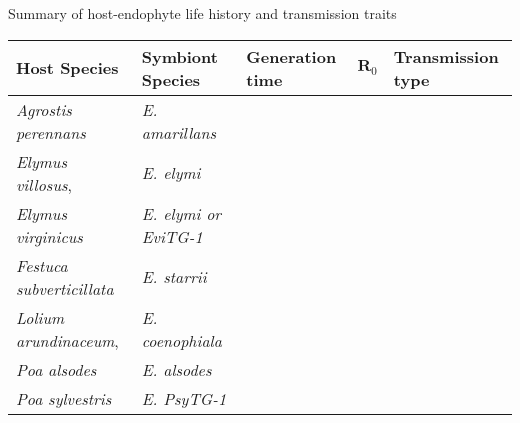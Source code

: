 \documentclass[12pt]{article}
\newcommand{\tom}[2]{{\color{red}{#1}}\footnote{\textit{\color{red}{#2}}}}
\begin{document}

 Summary of host-endophyte life history and transmission traits\\
\begin{table}[ht]
	\begin{adjustbox}{width=1\textwidth}
\begin{tabular}{lllll}
	\bf{Host Species} & \bf{Symbiont Species}& \bf{Generation time} & $\textbf {R}_0$ &\bf{ Transmission type}\\
	\hline
	\emph{Agrostis perennans} &\emph{E. amarillans}&&&\\
	\emph{Elymus villosus}, &\emph{E. elymi}&&&\\
	\emph{Elymus virginicus} &\emph{E. elymi or EviTG-1}&&&\\
	\emph{Festuca subverticillata} &\emph{E. starrii}&&&\\
	\emph{Lolium arundinaceum}, &\emph{E. coenophiala}& &&\\
	\emph{Poa alsodes} &\emph{E. alsodes}& &&\\
	\emph{Poa sylvestris}&\emph{E. PsyTG-1}& &&\\
\end{tabular}
\end{adjustbox}
\end{table}
\end{document}
